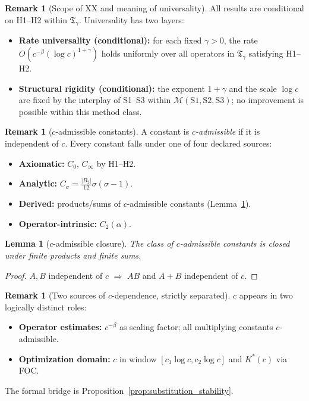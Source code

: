 \documentclass[12pt,a4paper]{amsart}
\newtheorem{lemma}[theorem]{Lemma}
\theoremstyle{definition}
\newtheorem{remark}[theorem]{Remark}
\begin{document}
\begin{remark}[Scope of XX and meaning of universality]
\label{rem:logstatus}
All results are conditional on H1--H2 within $\mathfrak{T}_\gamma$.
Universality has two layers:
\begin{itemize}[nosep]
  \item \textbf{Rate universality (conditional):}
    for each fixed $\gamma>0$, the rate $O(c^{-\beta}(\log c)^{1+\gamma})$
    holds uniformly over all operators in $\mathfrak{T}_\gamma$
    satisfying H1--H2.
  \item \textbf{Structural rigidity (conditional):}
    the exponent $1+\gamma$ and the scale $\log c$ are fixed by
    the interplay of S1--S3 within $\mathcal{M}(\mathrm{S1,S2,S3})$;
    no improvement is possible within this method class.
\end{itemize}
\end{remark}

\begin{remark}[$c$-admissible constants]
\label{rem:cadmissible}
A constant is \emph{$c$-admissible} if it is independent of $c$.
Every constant falls under one of four declared sources:
\begin{itemize}[nosep]
  \item \textbf{Axiomatic:} $C_0$, $C_\infty$ by H1--H2.
  \item \textbf{Analytic:} $C_\sigma = \frac{|B_2|}{12}\sigma(\sigma-1)$.
  \item \textbf{Derived:} products/sums of $c$-admissible constants
    (Lemma~\ref{lem:cadm_closure}).
  \item \textbf{Operator-intrinsic:} $C_2(\alpha)$.
\end{itemize}
\end{remark}

\begin{lemma}[$c$-admissible closure]
\label{lem:cadm_closure}
The class of $c$-admissible constants is closed under
finite products and finite sums.
\end{lemma}
\begin{proof}
$A,B$ independent of $c$ $\Rightarrow$ $AB$ and $A+B$ independent of $c$.
\end{proof}

\begin{remark}[Two sources of $c$-dependence, strictly separated]
\label{rem:dag_csplit}
$c$ appears in two logically distinct roles:
\begin{itemize}[nosep]
  \item \textbf{Operator estimates:} $c^{-\beta}$ as scaling factor;
    all multiplying constants $c$-admissible.
  \item \textbf{Optimization domain:} $c$ in window
    $[c_1\log c, c_2\log c]$ and $K^*(c)$ via FOC.
\end{itemize}
The formal bridge is Proposition~\ref{prop:substitution_stability}.
\end{remark}
\end{document}
